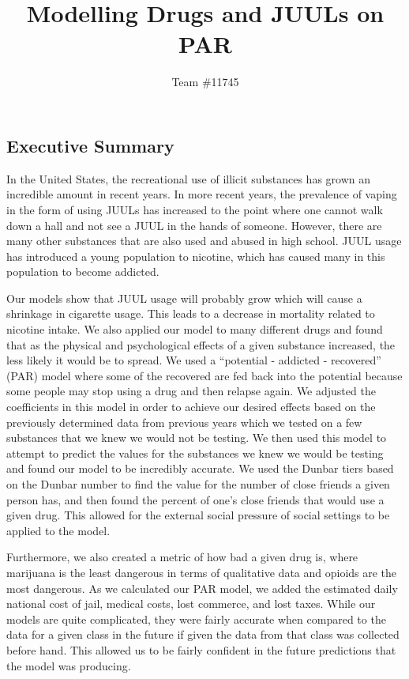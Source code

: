 \documentclass[12pt,letterpaper]{article}
\title{Modelling Drugs and JUULs on PAR}
\author{Team \#11745}
\begin{document}
\parindent=0.5in

\maketitle

\subsection*{Executive Summary}
\begin{singlespace}
\begin{small}
In the United States, the recreational use of illicit substances has grown an incredible amount in recent years. In more recent years, the prevalence of vaping in the form of using JUULs has increased to the point where one cannot walk down a hall and not see a JUUL in the hands of someone. However, there are many other substances that are also used and abused in high school. JUUL usage has introduced a young population to nicotine, which has caused many in this population to become addicted.

Our models show that JUUL usage will probably grow which will cause a shrinkage in cigarette usage. This leads to a decrease in mortality related to nicotine intake. We also applied our model to many different drugs and found that as the physical and psychological effects of a given substance increased, the less likely it would be to spread. We used a “potential - addicted - recovered” (PAR) model where some of the recovered are fed back into the potential because some people may stop using a drug and then relapse again. We adjusted the coefficients in this model in order to achieve our desired effects based on the previously determined data from previous years which we tested on a few substances that we knew we would not be testing. We then used this model to attempt to predict the values for the substances we knew we would be testing and found our model to be incredibly accurate. We used the Dunbar tiers based on the Dunbar number to find the value for the number of close friends a given person has, and then found the percent of one’s close friends that would use a given drug. This allowed for the external social pressure of social settings to be applied to the model. 

Furthermore, we also created a metric of how bad a given drug is, where marijuana is the least dangerous in terms of qualitative data and opioids are the most dangerous. As we calculated our PAR model, we added the estimated daily national cost of jail, medical costs, lost commerce, and lost taxes. While our models are quite complicated, they were fairly accurate when compared to the data for a given class in the future if given the data from that class was collected before hand. This allowed us to be fairly confident in the future predictions that the model was producing.
\end{small}
\end{singlespace}
\end{document}
